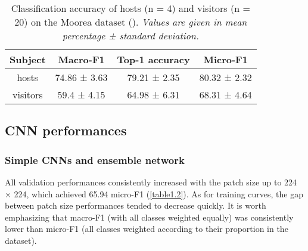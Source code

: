 \begin{table}[htbp]
  \centering
  \normalsize
  \caption[Classification accuracy of hosts (n = 4) and visitors (n = 20) on the Moorea dataset]{Classification accuracy of hosts (n = 4) and visitors (n = 20) on the Moorea dataset (\citep{beijbom_towards_2015}). \textit{Values are given in mean percentage ± standard deviation.}}
  \label{table1.1}
    \begin{tabular}{*{4}{c}}
        \toprule
        \textbf{Subject} & \textbf{Macro-F1} & \textbf{Top-1 accuracy} & \textbf{Micro-F1} \\ \midrule
        hosts            & 74.86 ± 3.63      & 79.21 ± 2.35            & 80.32 ± 2.32      \\
        visitors         & 59.4 ± 4.15       & 64.98 ± 6.31            & 68.31 ± 4.64      \\ \bottomrule
    \end{tabular}
\end{table}

\subsection{CNN performances}\label{chapitre1_6.2}

\subsubsection{Simple CNNs and ensemble network}\label{chapitre1_6.2.1}
All validation performances consistently increased with the patch size up to 224 × 224, which achieved 65.94 micro-F1 (\autoref{table1.2}). As for training curves, the gap between patch size performances tended to decrease quickly. It is worth emphasizing that macro-F1 (with all classes weighted equally) was consistently lower than micro-F1 (all classes weighted according to their proportion in the dataset).

